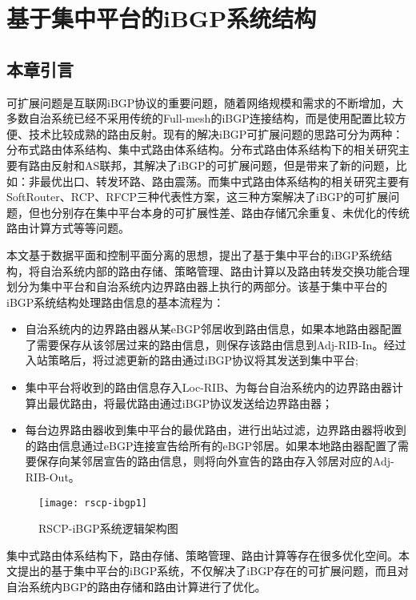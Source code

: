 \chapter{基于集中平台的iBGP系统结构}
\label{cha:architecture}


\section{本章引言}
可扩展问题是互联网iBGP协议的重要问题，随着网络规模和需求的不断增加，大多数自治系统已经不采用传统的Full-mesh的iBGP连接结构，而是使用配置比较方便、技术比较成熟的路由反射。现有的解决iBGP可扩展问题的思路可分为两种：分布式路由体系结构、集中式路由体系结构。分布式路由体系结构下的相关研究主要有路由反射和AS联邦，其解决了iBGP的可扩展问题，但是带来了新的问题，比如：非最优出口、转发环路、路由震荡。而集中式路由体系结构的相关研究主要有SoftRouter、RCP、RFCP三种代表性方案，这三种方案解决了iBGP的可扩展问题，但也分别存在集中平台本身的可扩展性差、路由存储冗余重复、未优化的传统路由计算方式等等问题。

本文基于数据平面和控制平面分离的思想，提出了基于集中平台的iBGP系统结构，将自治系统内部的路由存储、策略管理、路由计算以及路由转发交换功能合理划分为集中平台和自治系统内边界路由器上执行的两部分。该基于集中平台的iBGP系统结构处理路由信息的基本流程为：
\begin{itemize}
  \item 自治系统内的边界路由器从某eBGP邻居收到路由信息，如果本地路由器配置了需要保存从该邻居过来的路由信息，则保存该路由信息到Adj-RIB-In。经过入站策略后，将过滤更新的路由通过iBGP协议将其发送到集中平台;
  \item 集中平台将收到的路由信息存入Loc-RIB、为每台自治系统内的边界路由器计算出最优路由，将最优路由通过iBGP协议发送给边界路由器；
  \item 每台边界路由器收到集中平台的最优路由，进行出站过滤，边界路由器将收到的路由信息通过eBGP连接宣告给所有的eBGP邻居。如果本地路由器配置了需要保存向某邻居宣告的路由信息，则将向外宣告的路由存入邻居对应的Adj-RIB-Out。
\end{itemize}

\begin{figure}
  \centering
  \texttt{[image: rscp-ibgp1]}
  \caption{RSCP-iBGP系统逻辑架构图}
  \label{fig:rscp-ibgp1}
\end{figure}

集中式路由体系结构下，路由存储、策略管理、路由计算等存在很多优化空间。本文提出的基于集中平台的iBGP系统，不仅解决了iBGP存在的可扩展问题，而且对自治系统内BGP的路由存储和路由计算进行了优化。

